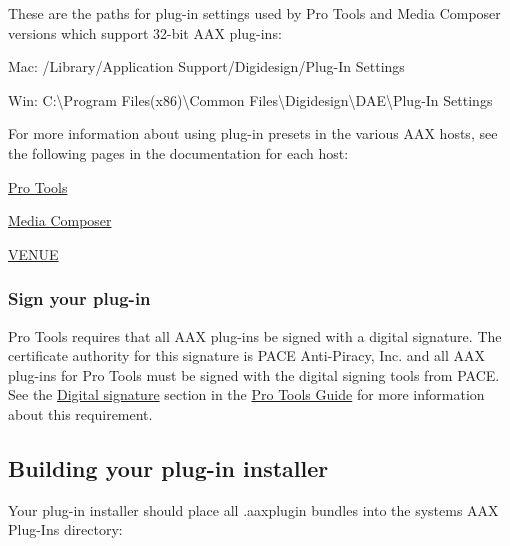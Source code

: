  These are the paths for plug-\/in settings used by Pro Tools and Media Composer versions which support 32-\/bit A\+A\+X plug-\/ins\+:

 
\begin{DoxyItemize}
\item Mac\+: /\+Library/\+Application Support/\+Digidesign/\+Plug-\/\+In Settings  
\item Win\+: C\+:\textbackslash{}Program Files(x86)\textbackslash{}Common Files\textbackslash{}Digidesign\textbackslash{}D\+A\+E\textbackslash{}Plug-\/\+In Settings  
\end{DoxyItemize}

 For more information about using plug-\/in presets in the various A\+A\+X hosts, see the following pages in the documentation for each host\+: 
\begin{DoxyItemize}
\item \hyperlink{a00360_subsection__presets_and_settings_management}{Pro Tools}  
\item \hyperlink{a00361_subsection__aax_media_composer_guide__features__presets}{Media Composer}  
\item \hyperlink{a00377_subsection__aax_venue_guide__features__presets}{V\+E\+N\+U\+E}  
\end{DoxyItemize}

\hypertarget{a00372_aax_distributing_finishing_signature}{}\subsubsection{Sign your plug-\/in}\label{a00372_aax_distributing_finishing_signature}
 Pro Tools requires that all A\+A\+X plug-\/ins be signed with a digital signature. The certificate authority for this signature is P\+A\+C\+E Anti-\/\+Piracy, Inc. and all A\+A\+X plug-\/ins for Pro Tools must be signed with the digital signing tools from P\+A\+C\+E. See the \hyperlink{a00360_subsection__digital_signature_}{Digital signature} section in the \hyperlink{a00360}{Pro Tools Guide} for more information about this requirement.



 \hypertarget{a00372_aax_distributing_installer}{}\subsection{Building your plug-\/in installer}\label{a00372_aax_distributing_installer}
 Your plug-\/in installer should place all .aaxplugin bundles into the system\textquotesingle{}s A\+A\+X Plug-\/\+Ins directory\+:


